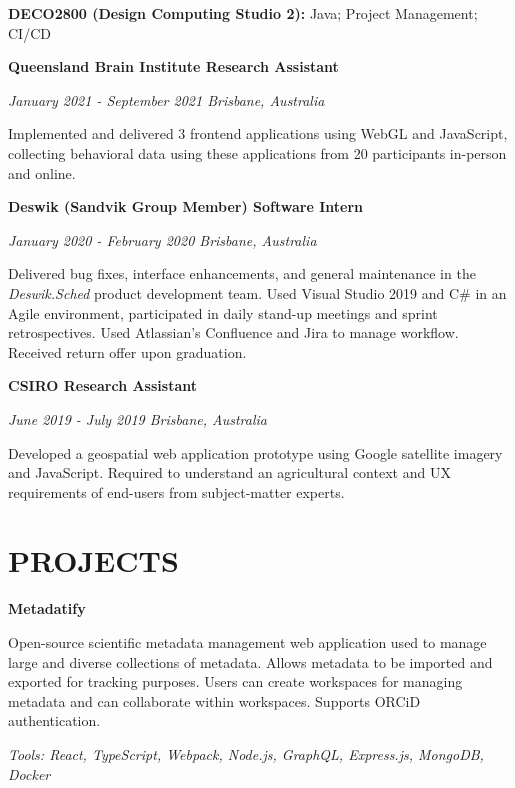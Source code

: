 \documentclass{article}
\begin{document}
  \textbf{DECO2800 (Design Computing Studio 2):} Java; Project Management; CI/CD

  \medbreak

  {\large\textbf{Queensland Brain Institute \hfill Research Assistant}}

  \textit{January 2021 - September 2021 \hfill Brisbane, Australia}

Implemented and delivered 3 frontend applications using WebGL and JavaScript, collecting behavioral data using these applications from 20 participants in-person and online.

  \pagebreak

  {\large\textbf{Deswik (Sandvik Group Member) \hfill Software Intern}}

  \textit{January 2020 - February 2020 \hfill Brisbane, Australia}

  Delivered bug fixes, interface enhancements, and general maintenance in the \textit{Deswik.Sched} product development team. Used Visual Studio 2019 and C\# in an Agile environment, participated in daily stand-up meetings and sprint retrospectives. Used Atlassian's Confluence and Jira to manage workflow. Received return offer upon graduation.

  \medbreak

  {\large\textbf{CSIRO \hfill Research Assistant}}

  \textit{June 2019 - July 2019 \hfill Brisbane, Australia}

  Developed a geospatial web application prototype using Google satellite imagery and JavaScript. Required to understand an agricultural context and UX requirements of end-users from subject-matter experts.

  \section*{\centering\uppercase{Projects}}

  \textbf{Metadatify}

  Open-source scientific metadata management web application used to manage large and diverse collections of metadata. Allows metadata to be imported and exported for tracking purposes. Users can create workspaces for managing metadata and can collaborate within workspaces. Supports ORCiD authentication.

  \textit{Tools: React, TypeScript, Webpack, Node.js, GraphQL, Express.js, MongoDB, Docker}

  \medbreak
\end{document}
